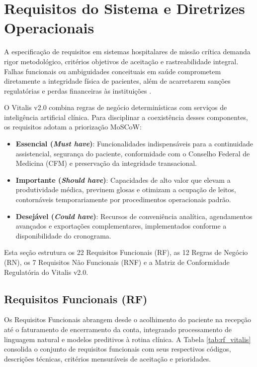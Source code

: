 \section{Requisitos do Sistema e Diretrizes Operacionais}
\label{sec:requisitos}

A especificação de requisitos em sistemas hospitalares de missão crítica demanda rigor metodológico, critérios objetivos de aceitação e rastreabilidade integral. Falhas funcionais ou ambiguidades conceituais em saúde comprometem diretamente a integridade física de pacientes, além de acarretarem sanções regulatórias e perdas financeiras às instituições \cite{sommerville:2019, pressman:2016}.

O Vitalis v2.0 combina regras de negócio determinísticas com serviços de inteligência artificial clínica. Para disciplinar a coexistência desses componentes, os requisitos adotam a priorização MoSCoW:
\begin{itemize}[leftmargin=*]
    \item \textbf{Essencial (\textit{Must have})}: Funcionalidades indispensáveis para a continuidade assistencial, segurança do paciente, conformidade com o Conselho Federal de Medicina (CFM) \cite{cfm_prontuario:2007, cfm_digital:2021} e preservação da integridade transacional.
    \item \textbf{Importante (\textit{Should have})}: Capacidades de alto valor que elevam a produtividade médica, previnem glosas e otimizam a ocupação de leitos, contornáveis temporariamente por procedimentos operacionais padrão.
    \item \textbf{Desejável (\textit{Could have})}: Recursos de conveniência analítica, agendamentos avançados e exportações complementares, implementados conforme a disponibilidade do cronograma.
\end{itemize}

Esta seção estrutura os 22 Requisitos Funcionais (RF), as 12 Regras de Negócio (RN), os 7 Requisitos Não Funcionais (RNF) e a Matriz de Conformidade Regulatória do Vitalis v2.0.

\subsection{Requisitos Funcionais (RF)}

Os Requisitos Funcionais abrangem desde o acolhimento do paciente na recepção até o faturamento de encerramento da conta, integrando processamento de linguagem natural e modelos preditivos à rotina clínica. A Tabela \ref{tab:rf_vitalis} consolida o conjunto de requisitos funcionais com seus respectivos códigos, descrições técnicas, critérios mensuráveis de aceitação e prioridades.

